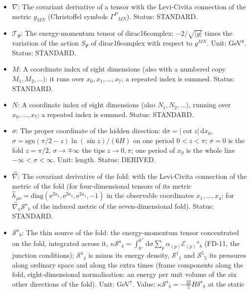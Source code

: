\documentclass[
  10pt,
]{article}
\providecommand{\tightlist}{%
  \setlength{\itemsep}{0pt}\setlength{\parskip}{0pt}}
\begin{document}
\begin{itemize}
\tightlist
\item
  \(\nabla\): The covariant derivative of a tensor with the Levi-Civita
  connection of the metric \(g_{MN}\) (Christoffel symbols
  \(\Gamma^P{}_{MN}\)). Status: STANDARD.
\item
  \(\mathcal{T}_\Psi\): The energy-momentum tensor of dirac16complex:
  \(-2/\sqrt{\lvert g\rvert}\) times the variation of the action
  \(S_\Psi\) of dirac16complex with respect to \(g^{MN}\). Unit:
  GeV\(^8\). Status: STANDARD.
\item
  \(M\): A coordinate index of eight dimensions (also with a numbered
  copy \(M_1, M_2, \dots\)): it runs over \(x_0, x_1, \dots, x_7\); a
  repeated index is summed. Status: STANDARD.
\item
  \(N\): A coordinate index of eight dimensions (also
  \(N_1, N_2, \dots\)), running over \(x_0, \dots, x_7\); a repeated
  index is summed. Status: STANDARD.
\item
  \(\sigma\): The proper coordinate of the hidden direction:
  \(\mathrm{d}\sigma = \lvert\cot z\rvert\,\mathrm{d}x_0\),
  \(\sigma = \mathrm{sgn}(\pi/2 - z)\ln(\sin z)/(6H)\) on one period
  \(0 < z < \pi\); \(\sigma = 0\) is the fold \(z = \pi/2\),
  \(\sigma \to \mp\infty\) the tips \(z \to 0, \pi\); one period of
  \(x_0\) is the whole line \(-\infty < \sigma < \infty\). Unit: length.
  Status: DERIVED.
\item
  \(\hat\nabla\): The covariant derivative of the fold: with the
  Levi-Civita connection of the metric of the fold (for four-dimensional
  tensors of its metric
  \(\hat h_{\mu\nu} = \mathrm{diag}(\mathrm{e}^{2a_4}, \mathrm{e}^{2a_4}, \mathrm{e}^{2a_4}, -1)\)
  in the observable coordinates \(x_1, \dots, x_4\); for
  \(\hat\nabla_a\mathcal{S}^a{}_b\) of the induced metric of the
  seven-dimensional fold). Status: STANDARD.
\item
  \(\mathcal{S}^a{}_b\): The thin source of the fold: the
  energy-momentum tensor concentrated on the fold, integrated across it,
  \(\kappa\mathcal{S}^a{}_b = \int_{0^-}^{0^+}\mathrm{d}\sigma\sum_p\alpha_{(p)}\mathcal{E}_{(p)}{}^a{}_b\)
  (FD-11, the junction conditions); \(\mathcal{S}^4{}_4\) is minus its
  energy density, \(\mathcal{S}^1{}_1\) and \(\mathcal{S}^5{}_5\) its
  pressures along ordinary space and along the extra times (frame
  components along the fold, eight-dimensional normalisation: an energy
  per unit volume of the six other directions of the fold). Unit:
  GeV\(^7\). Value:
  \(\kappa\mathcal{S}^a{}_b = -\frac{32}{5}H\delta^a{}_b\) at the static

\end{itemize}
\end{document}
